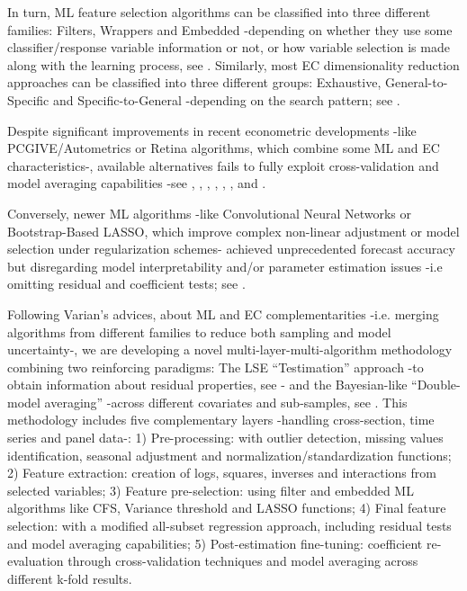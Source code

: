 \documentclass{juliacon}
\begin{document}
In turn, ML feature selection algorithms can be classified into three different families: Filters, Wrappers and Embedded -depending on whether they use some classifier/response variable information or not, or how variable selection is made along with the learning process, see \cite{CHANDRASHEKAR201416}. Similarly, most EC dimensionality reduction approaches can be classified into three different groups: Exhaustive, General-to-Specific and Specific-to-General -depending on the search pattern; see \cite{gluzmann2015}. \vskip 6pt

Despite significant improvements in recent econometric developments -like PCGIVE/Autometrics or Retina algorithms, which combine some ML and EC characteristics-, available alternatives fails to fully exploit cross-validation and model averaging capabilities -see \cite{Doornik09autometrics}, \cite{perezamaral2003}, \cite{DAVIDSON1981}, \cite{derksen1992}, \cite{marinucci2008}, \cite{herwartz2010}, and \cite{castle2006}. \vskip 6pt

Conversely, newer ML algorithms -like Convolutional Neural Networks or Bootstrap-Based LASSO, which improve complex non-linear adjustment or model selection under regularization schemes- achieved unprecedented forecast accuracy but disregarding model interpretability and/or parameter estimation issues -i.e omitting residual and coefficient tests; see \cite{Bzdok2018}. \vskip 6pt

Following Varian’s \cite{varian2014} advices, about ML and EC complementarities -i.e. merging algorithms from different families to reduce both sampling and model uncertainty-, we are developing a novel multi-layer-multi-algorithm methodology combining two reinforcing paradigms: The LSE “Testimation” approach -to obtain information about residual properties, see \cite{abramovich2006}- and the Bayesian-like “Double-model averaging” -across different covariates and sub-samples, see \cite{hoetening1999}. This methodology includes five complementary layers -handling cross-section, time series and panel data-: 1) Pre-processing: with outlier detection, missing values identification, seasonal adjustment and normalization/standardization functions; 2) Feature extraction: creation of logs, squares, inverses and interactions from selected variables; 3) Feature pre-selection: using filter and embedded ML algorithms like CFS, Variance threshold and LASSO functions; 4) Final feature selection: with a modified all-subset regression approach, including residual tests and model averaging capabilities; 5) Post-estimation fine-tuning: coefficient re-evaluation through cross-validation techniques and model averaging across different k-fold results. \vskip 6pt
\end{document}
